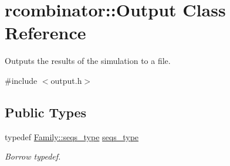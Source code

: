 \hypertarget{classrcombinator_1_1Output}{}\section{rcombinator\+:\+:Output Class Reference}
\label{classrcombinator_1_1Output}


Outputs the results of the simulation to a file.  




{\ttfamily \#include $<$output.\+h$>$}

\subsection*{Public Types}
\begin{DoxyCompactItemize}
\item 
\mbox{\label{classrcombinator_1_1Output_a2b29321fb770a4678d423ceb0e04ebaa}} 
typedef \mbox{\hyperlink{classrcombinator_1_1Family_abe1bd4ecd0792a403e9a4af26b8e5156}{Family\+::seqs\+\_\+type}} \mbox{\hyperlink{classrcombinator_1_1Output_a2b29321fb770a4678d423ceb0e04ebaa}{seqs\+\_\+type}}
\begin{DoxyCompactList}\small\item\em Borrow typedef. \end{DoxyCompactList}\end{DoxyCompactItemize}
